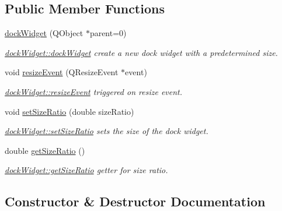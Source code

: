 \subsection*{Public Member Functions}
\begin{DoxyCompactItemize}
\item 
\mbox{\hyperlink{classdock_widget_af65ba19ef794133fb2b365dedc5b9d64}{dock\+Widget}} (Q\+Object $\ast$parent=0)
\begin{DoxyCompactList}\small\item\em \mbox{\hyperlink{classdock_widget_af65ba19ef794133fb2b365dedc5b9d64}{dock\+Widget\+::dock\+Widget}} create a new dock widget with a predetermined size. \end{DoxyCompactList}\item 
void \mbox{\hyperlink{classdock_widget_ae9cc3b91f10ee2af70fd74c6422848b6}{resize\+Event}} (Q\+Resize\+Event $\ast$event)
\begin{DoxyCompactList}\small\item\em \mbox{\hyperlink{classdock_widget_ae9cc3b91f10ee2af70fd74c6422848b6}{dock\+Widget\+::resize\+Event}} triggered on resize event. \end{DoxyCompactList}\item 
void \mbox{\hyperlink{classdock_widget_a7f6a50274259d918d9a9068b8a94fe80}{set\+Size\+Ratio}} (double size\+Ratio)
\begin{DoxyCompactList}\small\item\em \mbox{\hyperlink{classdock_widget_a7f6a50274259d918d9a9068b8a94fe80}{dock\+Widget\+::set\+Size\+Ratio}} sets the size of the dock widget. \end{DoxyCompactList}\item 
double \mbox{\hyperlink{classdock_widget_a2503861f92eb0ac30313dd713f398996}{get\+Size\+Ratio}} ()
\begin{DoxyCompactList}\small\item\em \mbox{\hyperlink{classdock_widget_a2503861f92eb0ac30313dd713f398996}{dock\+Widget\+::get\+Size\+Ratio}} getter for size ratio. \end{DoxyCompactList}\end{DoxyCompactItemize}


\subsection{Constructor \& Destructor Documentation}
\mbox{\label{classdock_widget_af65ba19ef794133fb2b365dedc5b9d64}} 
